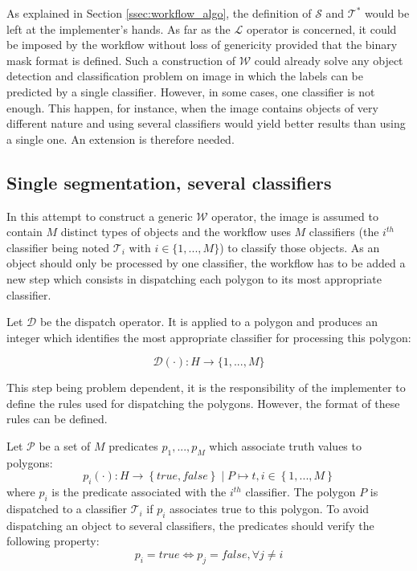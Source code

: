 As explained in Section \ref{ssec:workflow_algo}, the definition of $\mathcal{S}$ and $\mathcal{T}^*$ would be left at the implementer's hands. As far as the $\mathcal{L}$ operator is concerned, it could be imposed by the workflow without loss of genericity provided that the binary mask format is defined. Such a construction of $\mathcal{W}$ could already solve any object detection and classification problem on image in which the labels can be predicted by a single classifier. However, in some cases, one classifier is not enough. This happen, for instance, when the image contains objects of very different nature and using several classifiers would yield better results than using a single one. An extension is therefore needed.

\subsection{Single segmentation, several classifiers}
\label{ssec:single_several}

In this attempt to construct a generic $\mathcal{W}$ operator, the image is assumed to contain $M$ distinct types of objects and the workflow uses $M$ classifiers (the $i^{th}$ classifier being noted $\mathcal{T}_i$ with $i \in \{1,...,M\}$) to classify those objects. As an object should only be processed by one classifier, the workflow has to be added a new step which consists in dispatching each polygon to its most appropriate classifier. 

\begin{definition}\label{def:dispatch_op} 
	Let $\mathcal{D}$ be the dispatch operator. It is applied to a polygon and produces an integer which identifies the most appropriate classifier for processing this polygon: 

	\begin{equation}
		\mathcal{D}(\cdot) : H \rightarrow \{1,...,M\}
	\end{equation}
\end{definition}

This step being problem dependent, it is the responsibility of the implementer to define the rules used for dispatching the polygons. However, the format of these rules can be defined.

\begin{definition} 
	Let $\mathcal{P}$ be a set of $M$ predicates $p_1, ..., p_M$ which associate truth values to polygons:
	\begin{equation}
		p_i(\cdot) : H \rightarrow \left\{true, false\right\} \mid P \mapsto t, i \in \left\{1,...,M\right\} 
	\end{equation}
	where $p_i$ is the predicate associated with the $i^{th}$ classifier. The polygon $P$ is dispatched to a classifier $\mathcal{T}_i$ if $p_i$ associates true to this polygon. To avoid dispatching an object to several classifiers, the predicates should verify the following property:
	\begin{equation}
		p_i = true \Leftrightarrow p_j = false, \forall j \neq i
	\end{equation} 
\end{definition}

